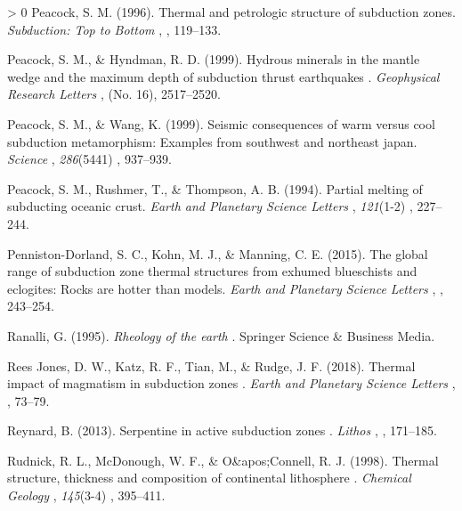 \documentclass[draft,linenumbers]{agujournal2018} %
\newlength{\cslhangindent} %
\newenvironment{CSLReferences}[3] %
 {%
  \setlength{\parindent}{0pt} %
  \ifodd #1 \everypar{\setlength{\hangindent}{\cslhangindent}}\ignorespaces\fi %
  \ifnum #2 > 0 %
  \setlength{\parskip}{#2\baselineskip} %
  \fi %
 }%
 {} %
\providecommand{\DIFaddtex}[1]{{\protect\color{blue} \sf #1}} %
\providecommand{\DIFadd}[1]{\texorpdfstring{\DIFaddtex{#1}}{#1}} %
\begin{document}
\begin{CSLReferences}{1}{0}
\leavevmode\hypertarget{ref-Peacock1996}{}%
\DIFadd{Peacock, S. M. (1996). Thermal and petrologic structure of subduction
zones. }\emph{\DIFadd{Subduction: Top to Bottom}}\DIFadd{, }\emph{\DIFadd{96}}\DIFadd{, 119--133.
}

\leavevmode\hypertarget{ref-Peacock1999a}{}%
\DIFadd{Peacock, S. M., \& Hyndman, R. D. (1999). }{\DIFadd{Hydrous minerals in the
mantle wedge and the maximum depth of subduction thrust earthquakes}}\DIFadd{.
}\emph{\DIFadd{Geophysical Research Letters}}\DIFadd{, }\emph{\DIFadd{26}}\DIFadd{(No. 16), 2517--2520.
}

\leavevmode\hypertarget{ref-Peacock1999b}{}%
\DIFadd{Peacock, S. M., \& Wang, K. (1999). Seismic consequences of warm versus
cool subduction metamorphism: Examples from southwest and northeast
japan. }\emph{\DIFadd{Science}}\DIFadd{, }\emph{286}(5441)\DIFadd{, 937--939.
}

\leavevmode\hypertarget{ref-Peacock1994}{}%
\DIFadd{Peacock, S. M., Rushmer, T., \& Thompson, A. B. (1994). Partial melting
of subducting oceanic crust. }\emph{\DIFadd{Earth and Planetary Science Letters}}\DIFadd{,
}\emph{121}(1-2)\DIFadd{, 227--244.
}

\leavevmode\hypertarget{ref-Penniston2015}{}%
\DIFadd{Penniston-Dorland, S. C., Kohn, M. J., \& Manning, C. E. (2015). The
global range of subduction zone thermal structures from exhumed
blueschists and eclogites: Rocks are hotter than models. }\emph{\DIFadd{Earth and
Planetary Science Letters}}\DIFadd{, }\emph{\DIFadd{428}}\DIFadd{, 243--254.
}

\leavevmode\hypertarget{ref-Ranalli1995}{}%
\DIFadd{Ranalli, G. (1995). }\emph{\DIFadd{Rheology of the earth}}\DIFadd{. Springer Science \&
Business Media.
}

\leavevmode\hypertarget{ref-ReesJones2018}{}%
\DIFadd{Rees Jones, D. W., Katz, R. F., Tian, M., \& Rudge, J. F. (2018).
}{\DIFadd{Thermal impact of magmatism in subduction zones}}\DIFadd{. }\emph{\DIFadd{Earth and
Planetary Science Letters}}\DIFadd{, }\emph{\DIFadd{481}}\DIFadd{, 73--79.
}

\leavevmode\hypertarget{ref-Reynard2013}{}%
\DIFadd{Reynard, B. (2013). }{\DIFadd{Serpentine in active subduction zones}}\DIFadd{.
}\emph{\DIFadd{Lithos}}\DIFadd{, }\emph{\DIFadd{178}}\DIFadd{, 171--185.
}

\leavevmode\hypertarget{ref-Rudnick1998}{}%
\DIFadd{Rudnick, R. L., McDonough, W. F., \& O\&apos;Connell, R. J. (1998).
}{\DIFadd{Thermal structure, thickness and composition of continental
lithosphere}}\DIFadd{. }\emph{\DIFadd{Chemical Geology}}\DIFadd{, }\emph{145}(3-4)\DIFadd{, 395--411.
}


\end{CSLReferences}
\end{document}
